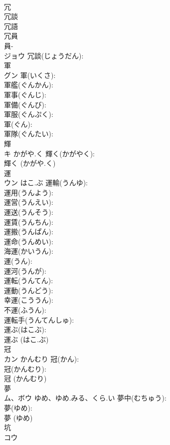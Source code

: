 \documentclass[8pt]{extreport}
\begin{document}
\begin{CJK}{UTF8}{min}
\\	冗			
\\	冗談 
\\	冗語 
\\	冗員 
\\	員-
\\	ジョウ		冗談(じょうだん): 
\\	軍			
\\	グン		軍(いくさ): 
\\	軍艦(ぐんかん): 
\\	軍事(ぐんじ): 
\\	軍備(ぐんび): 
\\	軍服(ぐんぷく): 
\\	軍(ぐん): 
\\	軍隊(ぐんたい): 
\\	輝			
\\	キ	かがや.く	輝く(かがやく): 
\\	輝く (かがや.く)
\\	運			
\\	ウン	はこ.ぶ	運輸(うんゆ): 
\\	運用(うんよう): 
\\	運営(うんえい): 
\\	運送(うんそう): 
\\	運賃(うんちん): 
\\	運搬(うんぱん): 
\\	運命(うんめい): 
\\	海運(かいうん): 
\\	運(うん): 
\\	運河(うんが): 
\\	運転(うんてん): 
\\	運動(うんどう): 
\\	幸運(こううん): 
\\	不運(ふうん): 
\\	運転手(うんてんしゅ): 
\\	運ぶ(はこぶ): 
\\	運ぶ (はこ.ぶ)
\\	冠			
\\	カン	かんむり	冠(かん): 
\\	冠(かんむり): 
\\	冠 (かんむり)
\\	夢			
\\	ム、ボウ	ゆめ、ゆめ.みる、くら.い	夢中(むちゅう): 
\\	夢(ゆめ): 
\\	夢 (ゆめ)
\\	坑			
\\	コウ			

\end{CJK}
\end{document}

